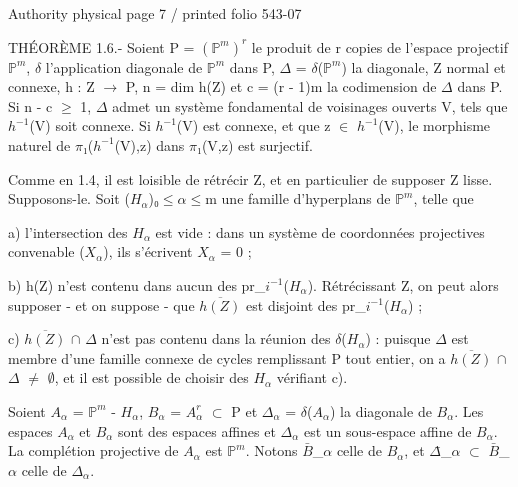 \documentclass[10pt,a4paper]{article}
\begin{document}
\noindent\begin{adjustbox}{max totalsize={\textwidth}{0.945\textheight},center}
\begin{minipage}{\textwidth}
\noindent\hfill\scriptsize Authority physical page 7 / printed folio 543-07\par\normalsize
\noindent THÉORÈME 1.6.- Soient P = \ensuremath{(ℙ^m)^r} le produit de r copies de l'espace projectif \ensuremath{ℙ^m}, \ensuremath{δ} l'application diagonale de \ensuremath{ℙ^m} dans P, \ensuremath{Δ} = \ensuremath{δ}(\ensuremath{ℙ^m}) la diagonale, Z normal et connexe, h : Z \ensuremath{→} P, n = dim h(Z) et c = (r - 1)m la codimension de \ensuremath{Δ} dans P. Si n - c \ensuremath{≥} 1, \ensuremath{Δ} admet un système fondamental de voisinages ouverts V, tels que \ensuremath{h^{-1}}(V) soit connexe. Si \ensuremath{h^{-1}}(V) est connexe, et que z \ensuremath{∈} \ensuremath{h^{-1}}(V), le morphisme naturel de \ensuremath{π₁}(\ensuremath{h^{-1}}(V),z) dans \ensuremath{π₁}(V,z) est surjectif.\par\smallskip
\noindent Comme en 1.4, il est loisible de rétrécir Z, et en particulier de supposer Z lisse. Supposons-le. Soit (\ensuremath{H_α})\ensuremath{₀≤α≤}m une famille d'hyperplans de \ensuremath{ℙ^m}, telle que\par\smallskip
\noindent a) l'intersection des \ensuremath{H_α} est vide : dans un système de coordonnées projectives convenable (\ensuremath{X_α}), ils s'écrivent \ensuremath{X_α} = 0 ;\par\smallskip
\noindent b) h(Z) n'est contenu dans aucun des pr\allowbreak\_\ensuremath{i^{-1}}(\ensuremath{H_α}). Rétrécissant Z, on peut alors supposer - et on suppose - que \ensuremath{\overline{h(Z)}} est disjoint des pr\allowbreak\_\ensuremath{i^{-1}}(\ensuremath{H_α}) ;\par\smallskip
\noindent c) \ensuremath{\overline{h(Z)}} \ensuremath{∩} \ensuremath{Δ} n'est pas contenu dans la réunion des \ensuremath{δ}(\ensuremath{H_α}) : puisque \ensuremath{Δ} est membre d'une famille connexe de cycles remplissant P tout entier, on a \ensuremath{\overline{h(Z)}} \ensuremath{∩} \ensuremath{Δ} \ensuremath{≠} \ensuremath{∅}, et il est possible de choisir des \ensuremath{H_α} vérifiant c).\par\smallskip
\noindent Soient \ensuremath{A_α} = \ensuremath{ℙ^m} - \ensuremath{H_α}, \ensuremath{B_α} = \ensuremath{A_α^r} \ensuremath{⊂} P et \ensuremath{Δ_α} = \ensuremath{δ}(\ensuremath{A_α}) la diagonale de \ensuremath{B_α}. Les espaces \ensuremath{A_α} et \ensuremath{B_α} sont des espaces affines et \ensuremath{Δ_α} est un sous-espace affine de \ensuremath{B_α}. La complétion projective de \ensuremath{A_α} est \ensuremath{ℙ^m}. Notons \ensuremath{\bar{B}}\allowbreak\_\ensuremath{α} celle de \ensuremath{B_α}, et \ensuremath{Δ}̄\allowbreak\_\ensuremath{α} \ensuremath{⊂} \ensuremath{\bar{B}}\allowbreak\_\ensuremath{α} celle de \ensuremath{Δ_α}.\par\smallskip

\end{minipage}
\end{adjustbox}
\end{document}
